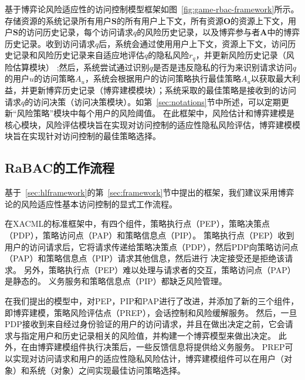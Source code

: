 基于博弈论风险适应性的访问控制模型框架如图~\ref{fig:game-rbac-framework}所示。存储资源的系统记录所有用户$\mathbf{S}$的所有用户上下文，所有资源$\mathbf{O}$的资源上下文，用户$\mathbf{S}$的访问历史记录，每个访问请求$q$的风险历史记录，以及博弈参与者$\mathbf{A}$中的博弈历史记录。收到访问请求$q$后，系统会通过使用用户上下文，资源上下文，访问历史记录和风险历史记录来自适应地评估$q$的隐私风险$r_q$，并更新风险历史记录（风险估算模块） ;然后，系统尝试通过识别$q$是否是违反隐私的行为来识别请求访问$q$的用户$u$的访问策略$A_u$，系统会根据用户的访问策略执行最佳策略$A_u$以获取最大利益，并更新博弈历史记录（博弈建模模块）；系统采取的最佳策略是接收到的访问请求$q$的访问决策（访问决策模块）。如第~\ref{sec:notations}节中所述，可以定期更新“风险策略”模块中每个用户的风险阈值。
在此框架中，风险估计和博弈建模是核心模块，风险评估模块旨在实现对访问控制的适应性隐私风险评估，博弈建模模块旨在实现针对访问控制的最佳策略选择。


\subsection{RaBAC的工作流程}


基于~\ref{sec:hlframework}的第~\ref{sec:framework}节中提出的框架，我们建议采用博弈论的风险适应性基本访问控制的显式工作流程。

在XACML的标准框架中，有四个组件，策略执行点（PEP），策略决策点（PDP），策略访问点（PAP）和策略信息点（PIP）。 策略执行点（PEP）收到用户的访问请求后，它将请求传递给策略决策点（PDP），然后PDP向策略访问点（PAP）和策略信息点（PIP）请求其他信息，然后进行 决定接受还是拒绝该请求。 另外，策略执行点（PEP）难以处理与请求者的交互，策略访问点（PAP）是静态的。 义务服务和策略信息点（PIP）都缺乏风险管理。


在我们提出的模型中，对PEP，PIP和PAP进行了改进，并添加了新的三个组件，即博弈建模，策略风险评估点（PREP），会话控制和风险缓解服务。 然后，一旦PDP接收到来自经过身份验证的用户的访问请求，并且在做出决定之前，它会请求与指定用户和历史记录相关的风险值，并构建一个博弈模型来做出决定。 此外，在由博弈建模组件执行决策后，一些反馈信息将提供给义务服务。 PREP可以实现对访问请求和用户的适应性隐私风险估计，博弈建模组件可以在用户（对象）和系统（对象）之间实现最佳访问策略选择。

